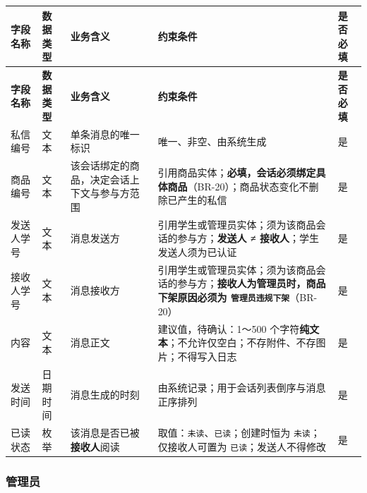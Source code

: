 \documentclass[12pt,a4paper]{ctexart}
\begin{document}
{\footnotesize
\begin{longtable}{|p{1.48cm}|p{1.48cm}|p{4.01cm}|p{7.55cm}|p{1.48cm}|}
\hline
\textbf{字段名称} & \textbf{数据类型} & \textbf{业务含义} & \textbf{约束条件} & \textbf{是否必填} \\
\hline
\endfirsthead
\hline
\textbf{字段名称} & \textbf{数据类型} & \textbf{业务含义} & \textbf{约束条件} & \textbf{是否必填} \\
\hline
\endhead
\hline
\endfoot
私信编号 & 文本 & 单条消息的唯一标识 & 唯一、非空、由系统生成 & 是 \\
\hline
商品编号 & 文本 & 该会话绑定的商品，决定会话上下文与参与方范围 & 引用商品实体；\textbf{必填，会话必须绑定具体商品}（BR-20）；商品状态变化不删除已产生的私信 & 是 \\
\hline
发送人学号 & 文本 & 消息发送方 & 引用学生或管理员实体；须为该商品会话的参与方；\textbf{发送人 ≠ 接收人}；学生发送人须为已认证 & 是 \\
\hline
接收人学号 & 文本 & 消息接收方 & 引用学生或管理员实体；须为该商品会话的参与方；\textbf{接收人为管理员时，商品下架原因必须为 \texttt{管理员违规下架}}（BR-20） & 是 \\
\hline
内容 & 文本 & 消息正文 & 建议值，待确认：1～500 个字符\textbf{纯文本}；不允许仅空白；不存附件、不存图片；不得写入日志 & 是 \\
\hline
发送时间 & 日期时间 & 消息生成的时刻 & 由系统记录；用于会话列表倒序与消息正序排列 & 是 \\
\hline
已读状态 & 枚举 & 该消息是否已被\textbf{接收人}阅读 & 取值：\texttt{未读}、\texttt{已读}；创建时恒为 \texttt{未读}；仅接收人可置为 \texttt{已读}；发送人不得修改 & 是 \\
\hline
\end{longtable}
}



\subsubsection*{管理员}
\end{document}
